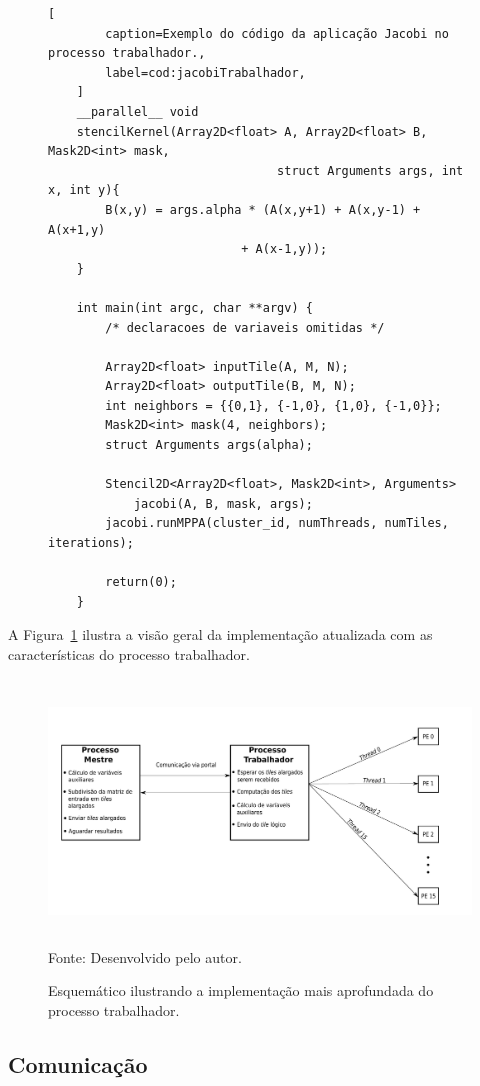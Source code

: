 \begin{figure}[!h]
    \begin{lstlisting}[
		caption=Exemplo do código da aplicação Jacobi no processo trabalhador.,
		label=cod:jacobiTrabalhador,
	]
	__parallel__ void
	stencilKernel(Array2D<float> A, Array2D<float> B, Mask2D<int> mask,
								struct Arguments args, int x, int y){
		B(x,y) = args.alpha * (A(x,y+1) + A(x,y-1) + A(x+1,y)
                           + A(x-1,y));
	}

	int main(int argc, char **argv) {
		/* declaracoes de variaveis omitidas */

		Array2D<float> inputTile(A, M, N);
		Array2D<float> outputTile(B, M, N);
		int neighbors = {{0,1}, {-1,0}, {1,0}, {-1,0}};
		Mask2D<int> mask(4, neighbors);
		struct Arguments args(alpha);

		Stencil2D<Array2D<float>, Mask2D<int>, Arguments>
			jacobi(A, B, mask, args);
		jacobi.runMPPA(cluster_id, numThreads, numTiles, iterations);

		return(0);
	}
\end{lstlisting}
\end{figure}

A Figura~\ref{fig:visaoGeralTrabalhador} ilustra a visão geral da implementação
atualizada com as características do processo trabalhador.

\begin{figure}[!h]
	\centering
    \caption{Esquemático ilustrando a implementação mais aprofundada do processo trabalhador.}
    \includegraphics[width=1.2\textwidth, height=7cm]{figs/visaoGeralPSKELMPPATrabalhador.pdf} \\
    Fonte: Desenvolvido pelo autor.
    \label{fig:visaoGeralTrabalhador}
\end{figure}


\subsection{Comunicação}
\label{sec:comunicacao}

